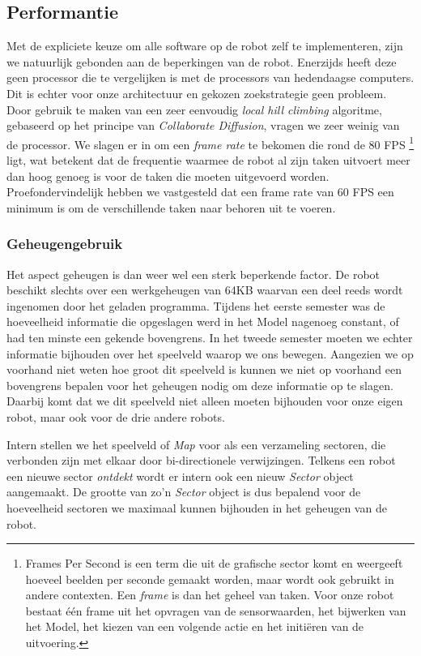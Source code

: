 \documentclass[12pt,a4paper]{report}
\begin{document}
\subsection{Performantie}
\label{sect:performance}

Met de expliciete keuze om alle software op de robot zelf te implementeren, zijn we natuurlijk gebonden aan de beperkingen van de robot. Enerzijds heeft deze geen processor die te vergelijken is met de processors van hedendaagse computers. Dit is echter voor onze architectuur en gekozen zoekstrategie geen probleem. Door gebruik te maken van een zeer eenvoudig \emph{local hill climbing} algoritme, gebaseerd op het principe van \emph{Collaborate Diffusion}, vragen we zeer weinig van de processor. We slagen er in om een \emph{frame rate} te bekomen die rond de 80 FPS \footnote{Frames Per Second is een term die uit de grafische sector komt en weergeeft hoeveel beelden per seconde gemaakt worden, maar wordt ook gebruikt in andere contexten. Een \emph{frame} is dan het geheel van taken. Voor onze robot bestaat \'e\'en frame uit het opvragen van de sensorwaarden, het bijwerken van het Model, het kiezen van een volgende actie en het initi\"eren van de uitvoering.} ligt, wat betekent dat de frequentie waarmee de robot al zijn taken uitvoert meer dan hoog genoeg is voor de taken die moeten uitgevoerd worden. Proefondervindelijk hebben we vastgesteld dat een frame rate van 60 FPS een minimum is om de verschillende taken naar behoren uit te voeren.

\subsubsection{Geheugengebruik}

Het aspect geheugen is dan weer wel een sterk beperkende factor. De robot beschikt slechts over een werkgeheugen van 64KB waarvan een deel reeds wordt ingenomen door het geladen programma. Tijdens het eerste semester was de hoeveelheid informatie die opgeslagen werd in het Model nagenoeg constant, of had ten minste een gekende bovengrens. In het tweede semester moeten we echter informatie bijhouden over het speelveld waarop we ons bewegen. Aangezien we op voorhand niet weten hoe groot dit speelveld is kunnen we niet op voorhand een bovengrens bepalen voor het geheugen nodig om deze informatie op te slagen. Daarbij komt dat we dit speelveld niet alleen moeten bijhouden voor onze eigen robot, maar ook voor de drie andere robots.

Intern stellen we het speelveld of \emph{Map} voor als een verzameling sectoren, die verbonden zijn met elkaar door bi-directionele verwijzingen. Telkens een robot een nieuwe sector \emph{ontdekt} wordt er intern ook een nieuw \emph{Sector} object aangemaakt. De grootte van zo'n \emph{Sector} object is dus bepalend voor de hoeveelheid sectoren we maximaal kunnen bijhouden in het geheugen van de robot.
\end{document}
